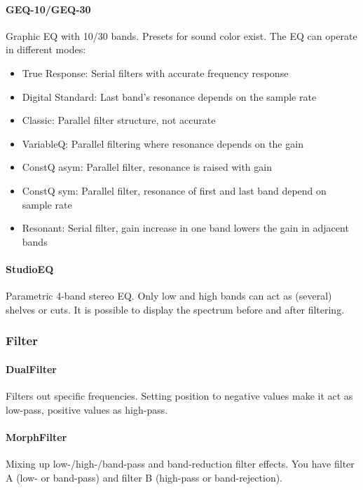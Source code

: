 \documentclass[10pt]{article}
\begin{document}
\paragraph{GEQ-10/GEQ-30} Graphic EQ with 10/30 bands. Presets for sound color exist. The EQ can operate in different modes:

\begin{itemize}
	\item True Response: Serial filters with accurate frequency response
	\item Digital Standard: Last band's resonance depends on the sample rate
	\item Classic: Parallel filter structure, not accurate
	\item VariableQ: Parallel filtering where resonance depends on the gain
	\item ConstQ asym: Parallel filter, resonance is raised with gain
	\item ConstQ sym: Parallel filter, resonance of first and last band depend on sample rate
	\item Resonant: Serial filter, gain increase in one band lowers the gain in adjacent bands
\end{itemize}

\paragraph{StudioEQ} Parametric 4-band stereo EQ. Only low and high bands can act as (several) shelves or cuts. It is possible to display the spectrum before and after filtering.

\subsubsection{Filter}

\paragraph{DualFilter} Filters out specific frequencies. Setting position to negative values make it act as low-pass, positive values as high-pass.

\paragraph{MorphFilter} Mixing up low-/high-/band-pass and band-reduction filter effects. You have filter A (low- or band-pass) and filter B (high-pass or band-rejection).
\end{document}
